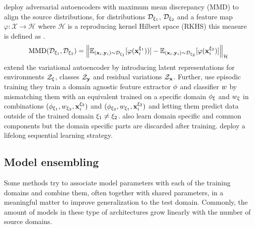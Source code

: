\citet{LiPWK18} deploy adversarial autoencoders with maximum mean discrepancy (MMD) \citep{GrettonBRSS12} to align the source distributions, \ie for distributions $\mathcal{D}_{\xi_1}$, $\mathcal{D}_{\xi_2}$ and a feature map $\varphi: \mathcal{X} \rightarrow \mathcal{H}$ where $\mathcal{H}$ is a reproducing kernel Hilbert space (RKHS) this measure is defined as .
\begin{equation}
\label{eq:mmd}
    \operatorname{MMD}(\mathcal{D}_{\xi_1}, \mathcal{D}_{\xi_2})=\left\|\mathbb{E}_{(\mathbf{x}_i, \mathbf{y}_i) \sim \mathcal{D}_{\xi_1}}[\varphi(\mathbf{x}_i^{\xi_1}))]-\mathbb{E}_{(\mathbf{x}_i, \mathbf{y}_i) \sim \mathcal{D}_{\xi_2}}[\varphi(\mathbf{x}_i^{\xi_2})]\right\|_{\mathcal{H}}
\end{equation}
\citet{ilse2019diva} extend the variational autoencoder \citep{KingmaW13} by introducing latent representations for environments $\mathcal{Z}_\xi$, classes $\mathcal{Z}_{\mathbf{y}}$ and residual variations $\mathcal{Z}_{\mathbf{x}}$. Further, \citet{LiZYLSH19} use episodic training \ie they train a domain agnostic feature extractor $\phi$ and classifier $w$ by mismatching them with an equivalent trained on a specific domain $\phi_\xi$ and $w_\xi$ in combinations $(\phi_{\xi_1}, w_{\xi_2}, \mathbf{x}^{\xi_2}_i)$ and $(\phi_{\xi_2}, w_{\xi_1}, \mathbf{x}^{\xi_2}_i)$ and letting them predict data outside of the trained domain $\xi_1 \neq \xi_2$. \citet{piratla2020efficient} also learn domain specific and common components but the domain specific parts are discarded after training. \citet{li2020sequential} deploy a lifelong sequential learning strategy.

\subsection{Model ensembling}

Some methods try to associate model parameters with each of the training domains and combine them, often together with shared parameters, in a meaningful matter to improve generalization to the test domain. Commonly, the amount of models in these type of architectures grow linearly with the number of source domains. 

